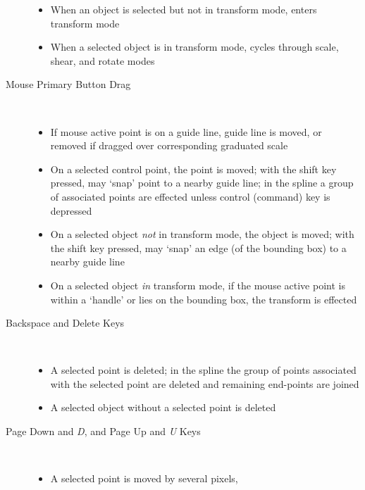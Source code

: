 \begin{description}
		    \begin{itemize}
		      \item When an object is selected but not in
		        transform mode, enters transform mode
		      \item When a selected object is in transform mode,
		        cycles through scale, shear, and rotate modes
		    \end{itemize}
		  \item[Mouse Primary Button Drag] \hfill \\
		    \begin{itemize}
		      \item If mouse active point is on a guide line,
		        guide line is moved, or removed if dragged over
		        corresponding graduated scale
		      \item On a selected control point, the point
		        is moved; with the shift key pressed,
		        may `snap' point to a nearby guide line;
		        in the \dtybeznl{} spline a group of associated
		        points are effected unless control (command)
		        key is depressed
		      \item On a selected object \emph{not}
		        in transform mode,
		        the object is moved; with the shift key
		        pressed, may `snap' an edge (of the bounding
		        box) to a nearby guide line
		      \item On a selected object \emph{in} transform mode,
		        if the mouse active point is within a `handle'
		        or lies on the bounding box, the
		        transform is effected
		    \end{itemize}
		  \item[Backspace and Delete Keys] \hfill \\
		    \begin{itemize}
		      \item A selected point is deleted;
		        in the \dtybeznl{} spline the group of
		        points associated with the selected point
		        are deleted and remaining end-points are joined
		      \item A selected object
		        without a selected point is deleted
		    \end{itemize}
		  \item[Page Down and \emph{D},
		  and Page Up and \emph{U} Keys] \hfill \\
		    \begin{itemize}
		      \item A selected point
		        is moved by several pixels,

\end{itemize}
\end{description}
